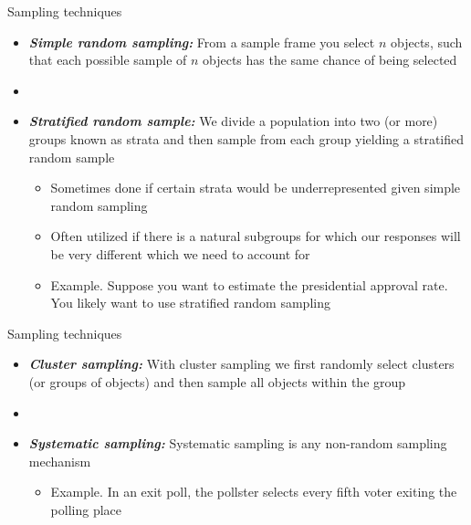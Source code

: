 \documentclass[xcolor=dvipsnames]{beamer}
\begin{document}
\begin{frame}{Sampling techniques}
	\begin{itemize}
		\item \textbf{\emph{Simple random sampling:}} From a sample frame you select $n$ objects, such that each possible sample of $n$ objects has the same chance of being selected
		
		\item[]
		
		\item \textbf{\emph{Stratified random sample:}} We divide a population into two (or more) groups known as strata and then sample from each group yielding a stratified random sample
		\begin{itemize}
			\item Sometimes done if certain strata would be underrepresented given simple random sampling
			\item Often utilized if there is a natural subgroups for which our responses will be very different which we need to account for
			\item Example. Suppose you want to estimate the presidential approval rate. You likely want to use stratified random sampling
		\end{itemize}
	\end{itemize}
\end{frame}

\begin{frame}{Sampling techniques}
\begin{itemize}
	\item \textbf{\emph{Cluster sampling:}} With cluster sampling we first randomly select clusters (or groups of objects) and then sample all objects within the group
	\item[]
	\item \textbf{\emph{Systematic sampling:}} Systematic sampling is any non-random sampling mechanism
	\begin{itemize}
		\item Example. In an exit poll, the pollster selects every fifth voter exiting the polling place
	\end{itemize}
\end{itemize}
\end{frame}
\end{document}
